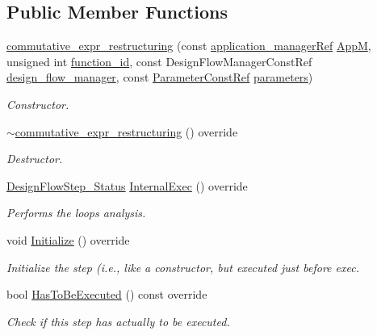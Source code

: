 \subsection*{Public Member Functions}
\begin{DoxyCompactItemize}
\item 
\hyperlink{classcommutative__expr__restructuring_aa4c5653385cc2917ada9cf5ee3936cd3}{commutative\+\_\+expr\+\_\+restructuring} (const \hyperlink{application__manager_8hpp_a04ccad4e5ee401e8934306672082c180}{application\+\_\+manager\+Ref} \hyperlink{classFrontendFlowStep_a0ac0d8db2a378416583f51c4faa59d15}{AppM}, unsigned int \hyperlink{classFunctionFrontendFlowStep_a58ef2383ad1a212a8d3f396625a4b616}{function\+\_\+id}, const Design\+Flow\+Manager\+Const\+Ref \hyperlink{classDesignFlowStep_ab770677ddf087613add30024e16a5554}{design\+\_\+flow\+\_\+manager}, const \hyperlink{Parameter_8hpp_a37841774a6fcb479b597fdf8955eb4ea}{Parameter\+Const\+Ref} \hyperlink{classDesignFlowStep_a802eaafe8013df706370679d1a436949}{parameters})
\begin{DoxyCompactList}\small\item\em Constructor. \end{DoxyCompactList}\item 
\hyperlink{classcommutative__expr__restructuring_a7d25b3a3c5ecbc43890f7cc8613bd9f9}{$\sim$commutative\+\_\+expr\+\_\+restructuring} () override
\begin{DoxyCompactList}\small\item\em Destructor. \end{DoxyCompactList}\item 
\hyperlink{design__flow__step_8hpp_afb1f0d73069c26076b8d31dbc8ebecdf}{Design\+Flow\+Step\+\_\+\+Status} \hyperlink{classcommutative__expr__restructuring_adbf4a35cb5e3a0a7be1abe3aca2f46bf}{Internal\+Exec} () override
\begin{DoxyCompactList}\small\item\em Performs the loops analysis. \end{DoxyCompactList}\item 
void \hyperlink{classcommutative__expr__restructuring_ae09db402c964798f3e6386e65095d0b3}{Initialize} () override
\begin{DoxyCompactList}\small\item\em Initialize the step (i.\+e., like a constructor, but executed just before exec. \end{DoxyCompactList}\item 
bool \hyperlink{classcommutative__expr__restructuring_a9ea0a98a356901b31b212ad25255e784}{Has\+To\+Be\+Executed} () const override
\begin{DoxyCompactList}\small\item\em Check if this step has actually to be executed. \end{DoxyCompactList}\end{DoxyCompactItemize}
